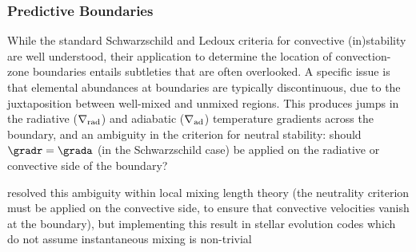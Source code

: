 {\color{brown}
\subsubsection{Predictive Boundaries}

While the standard Schwarzschild and Ledoux criteria for convective (in)stability are well understood, their application to determine the location of convection-zone boundaries entails subtleties that are often overlooked. A specific issue is that elemental abundances at boundaries are typically discontinuous, due to the juxtaposition between well-mixed and unmixed regions. This produces jumps in the radiative ($\nabla_{\rm rad}$) and adiabatic ($\nabla_{\rm ad}$) temperature gradients across the boundary, and an ambiguity in the criterion for neutral stability: should $\gradr=\grada$ (in the Schwarzschild case) be applied on the radiative or convective side of the boundary?

\citet{Gabriel:2014} resolved this ambiguity within local mixing length theory (the neutrality criterion must be applied on the convective side, to ensure that convective velocities vanish at the boundary), but implementing this result in stellar evolution codes which do not assume instantaneous mixing is non-trivial

}